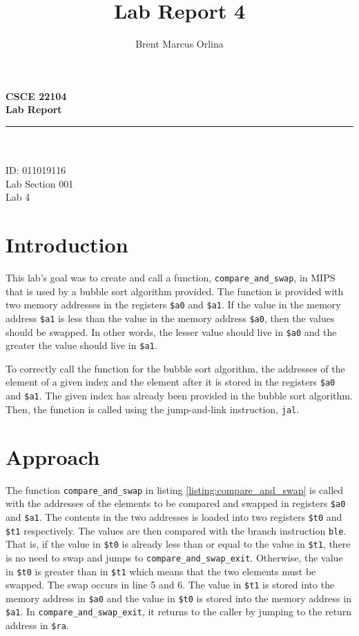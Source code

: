 \documentclass[11pt]{report}
\makeatletter
\newcommand{\@labsection}{000}
\newcommand{\labsection}[1]{
    \renewcommand{\@labsection}{#1}
}
\newcommand{\@labnumber}{0}
\newcommand{\labnumber}[1]{
    \renewcommand{\@labnumber}{#1}
}
\newcommand{\@shortsubmitted}{1/1/70}
\newcommand{\shortsubmitted}[1]{
    \renewcommand{\@shortsubmitted}{#1}
}
\renewcommand{\maketitle}{
    \newgeometry{left=1in, right=1in, top=1.75in, textheight=8.25in}
    \singlespacing
    \begin{center}
        {\huge \bf CSCE 22104} \\
        \vspace{2.5em}
        {\Large \bf Lab Report} \\
        \vspace{2em}
        \noindent\rule{20em}{0.4pt} \\
        \vspace{1em}
        {\Large \@author} \\
        \vspace{.75em}
        {\normalsize ID: 011019116} \\
        \vspace{.75em}
        {\normalsize Lab Section \@labsection} \\
        \vspace{.75em}
        {\normalsize Lab \@labnumber} \\
    \end{center}
    \newpage
    \restoregeometry
}
\makeatother
\begin{document}
\title{Lab Report 4}
\author{Brent Marcus Orlina}

\labsection{001}
\labnumber{4}

\shortsubmitted{2/5/25}

\maketitle

\section*{Introduction}
This lab's goal was to create and call a function, \verb|compare_and_swap|, in MIPS that is used by
a bubble sort algorithm provided. The function is provided with two memory addresses in the
registers \verb|$a0| and \verb|$a1|. If the value in the memory address \verb|$a1| is less than the
value in the memory address \verb|$a0|, then the values should be swapped. In other words, the lesser
value should live in \verb|$a0| and the greater the value should live in \verb|$a1|.

To correctly call the function for the bubble sort algorithm, the addresses of the element of a
given index and the element after it is stored in the registers \verb|$a0| and \verb|$a1|. The given
index has already been provided in the bubble sort algorithm. Then, the function is called using the
jump-and-link instruction, \verb|jal|. 

\section*{Approach}

The function \verb|compare_and_swap| in listing \ref{listing:compare_and_swap} is called with the
addresses of the elements to be compared and swapped in registers \verb|$a0| and \verb|$a1|. The
contents in the two addresses is loaded into two registers \verb|$t0| and \verb|$t1| respectively.
The values are then compared with the branch instruction \verb|ble|. That is, if the value in
\verb|$t0| is already less than or equal to the value in \verb|$t1|, there is no need to swap and
jumps to \verb|compare_and_swap_exit|. Otherwise, the value in \verb|$t0| is greater than in
\verb|$t1| which means that the two elements must be swapped. The swap occurs in line 5 and 6. The
value in \verb|$t1| is stored into the memory address in \verb|$a0| and the value in \verb|$t0| is
stored into the memory address in \verb|$a1|. In \verb|compare_and_swap_exit|, it returns to the
caller by jumping to the return address in \verb|$ra|.
\end{document}
